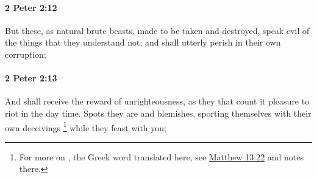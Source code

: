 		\paragraph{2 Peter 2:12} %
			\label{2PETER-2-12}

			But these, as natural brute beasts, made to be taken and destroyed, speak evil of the things that they understand not; and shall utterly perish in their own corruption;

			\begin{framed}
			\scriptsize
				\begin{compactdesc}
					\item[SBLG] 
				\end{compactdesc}
			\end{framed}

		\paragraph{2 Peter 2:13} %
			\label{2PETER-2-13}

			And shall receive the reward of unrighteousness, as they that count it pleasure to riot in the day time.  Spots they are and blemishes, sporting themselves with their own deceivings%
				\footnote{%
					For more on , the Greek word translated here, see \hyperref[MATTHEW-13-22]{Matthew 13:22} and notes there.
					}
			while they feast with you;

